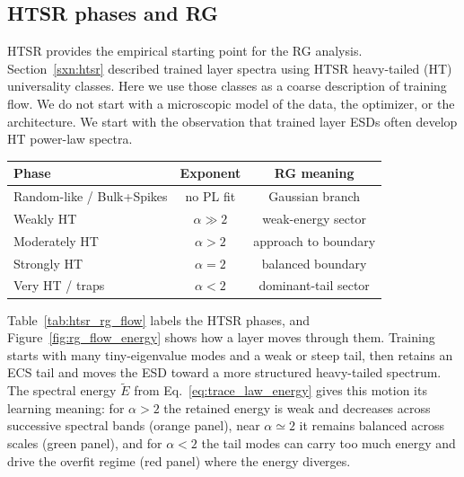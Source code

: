 \documentclass[10pt,twocolumn]{article}
\newcommand{\Ered}{\widetilde{E}}
\begin{document}
\subsection{HTSR phases and RG}
\label{sxn:htsr_rg}

HTSR provides the empirical starting point for the RG analysis.
Section~\ref{sxn:htsr} described trained layer spectra using HTSR heavy-tailed (HT)  universality classes.
Here we use those classes as a coarse description of training flow.
We do not start with a microscopic model of the data, the optimizer, or the architecture.
We start with the observation that trained layer ESDs often develop HT power-law spectra.

\begin{center}
\small
\setlength{\tabcolsep}{2.5pt}
\renewcommand{\arraystretch}{1.06}
\label{tab:htsr_rg_flow}
\begin{tabularx}{\linewidth}{@{}lcc@{}}
\toprule
Phase & Exponent & RG meaning \\
\midrule
Random-like / Bulk+Spikes & no PL fit & Gaussian branch \\
Weakly HT & $\alpha\gg2$ & weak-energy sector \\
Moderately HT & $\alpha>2$ & approach to boundary \\
Strongly HT & $\alpha=2$ & balanced boundary \\
Very HT / traps & $\alpha<2$ & dominant-tail sector \\
\bottomrule
\end{tabularx}
\end{center}

Table~\ref{tab:htsr_rg_flow} labels the HTSR phases, and Figure~\ref{fig:rg_flow_energy} shows how a layer moves through them. Training starts with many tiny-eigenvalue modes and a weak or steep tail, then retains an ECS tail and moves the ESD toward a more structured heavy-tailed spectrum.
The spectral energy $\Ered$ from Eq.~\eqref{eq:trace_law_energy} gives this motion its learning meaning:
for $\alpha>2$ the retained energy is weak and decreases across successive spectral bands (orange panel),
near $\alpha\simeq2$ it remains balanced across scales (green panel),
and for $\alpha<2$ the tail modes can carry too much energy and drive the overfit regime (red panel)
where the energy diverges.
\end{document}
